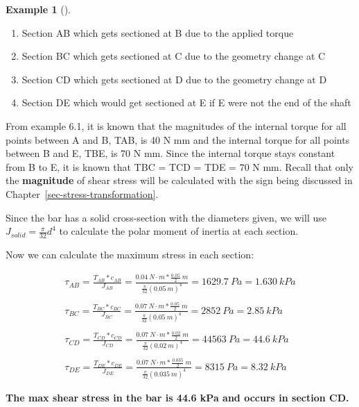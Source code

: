 \documentclass[
  letterpaper,
  DIV=11,
  numbers=noendperiod]{scrreprt}
\providecommand{\tightlist}{%
  \setlength{\itemsep}{0pt}\setlength{\parskip}{0pt}}\usepackage{longtable,booktabs,array}
\theoremstyle{definition}
\newtheorem{example}{Example}[chapter]
\theoremstyle{remark}
\begin{document}
\begin{tcolorbox}
\begin{example}[]
\begin{tcolorbox}
\begin{enumerate}
\def\labelenumi{\arabic{enumi}.}
\tightlist
\item
  Section AB which gets sectioned at B due to the applied torque
\item
  Section BC which gets sectioned at C due to the geometry change at C
\item
  Section CD which gets sectioned at D due to the geometry change at D
\item
  Section DE which would get sectioned at E if E were not the end of the
  shaft
\end{enumerate}

From example 6.1, it is known that the magnitudes of the internal torque
for all points between A and B, TAB, is 40 N mm and the internal torque
for all points between B and E, TBE, is 70 N mm. Since the internal
torque stays constant from B to E, it is known that TBC = TCD = TDE = 70
N mm. Recall that only the \textbf{magnitude} of shear stress will be
calculated with the sign being discussed in
Chapter~\ref{sec-stress-transformation}.

Since the bar has a solid cross-section with the diameters given, we
will use \(J_{solid}=\frac{\pi}{32} d^4\) to calculate the polar moment
of inertia at each section.

Now we can calculate the maximum stress in each section:

\[
\begin{gathered}
\tau_{AB}=\frac{T_{AB}*c_{AB}}{J_{AB}}=\frac{0.04{~N}\cdot{m}*\frac{0.05}{2} {~m}} {\frac{\pi}{32}(0.05{~m})^4}=1629.7{~Pa}=1.630{~kPa} \\
\\
\tau_{BC}=\frac{T_{BC}*c_{BC}}{J_{BC}}=\frac{0.07{~N}\cdot{m}*\frac{0.05}{2}{~m}}{\frac{\pi}{32}(0.05{~m})^4}=2852{~Pa}=2.85{~kPa} \\
\\
\tau_{CD}=\frac{T_{CD}*c_{CD}}{J_{CD}}=\frac{0.07{~N}\cdot{m}*\frac{0.02}{2}~{m}}{\frac{\pi}{32}(0.02{~m})^4}=44563{~Pa}=44.6{~kPa} \\
\\
\tau_{DE}=\frac{T_{DE}*c_{DE}}{J_{DE}}=\frac{0.07{~N}\cdot{m}*\frac{0.035}{2}{~m}}{\frac{\pi}{32}(0.035{~m})^4}=8315{~Pa}=8.32{~kPa}
\end{gathered}
\]

\textbf{The max shear stress in the bar is 44.6 kPa and occurs in
section CD.}

\end{tcolorbox}

\end{example}

\end{tcolorbox}
\end{document}
